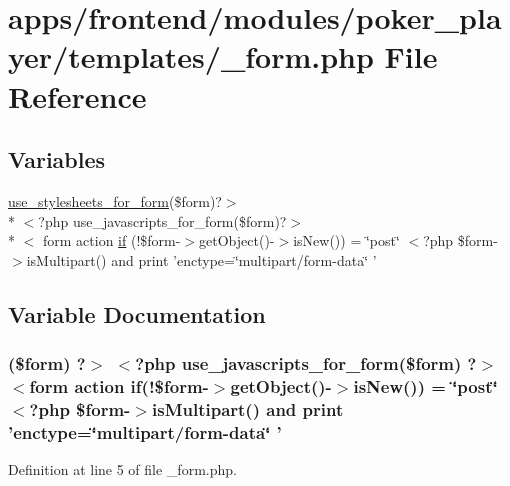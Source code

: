 \hypertarget{frontend_2modules_2poker__player_2templates_2__form_8php}{\section{apps/frontend/modules/poker\-\_\-player/templates/\-\_\-form.php File Reference}
\label{frontend_2modules_2poker__player_2templates_2__form_8php}
}
\subsection*{Variables}
\begin{DoxyCompactItemize}
\item 
\hyperlink{live_2modules_2user_2templates_2__form_8php_a86bc4522fdbe625b07bc4a4d6eec3df7}{use\-\_\-stylesheets\-\_\-for\-\_\-form}(\$form)?$>$\\*
$<$?php use\-\_\-javascripts\-\_\-for\-\_\-form(\$form)?$>$\\*
$<$ form action \hyperlink{frontend_2modules_2poker__player_2templates_2__form_8php_ae30a307b320d8da5d9a945eaf68f7549}{if} (!\$form-\/$>$get\-Object()-\/$>$is\-New()) = \char`\"{}post\char`\"{} $<$?php \$form-\/$>$is\-Multipart() and print 'enctype=\char`\"{}multipart/form-\/data\char`\"{} '
\end{DoxyCompactItemize}


\subsection{Variable Documentation}
\hypertarget{frontend_2modules_2poker__player_2templates_2__form_8php_ae30a307b320d8da5d9a945eaf68f7549}{
\subsubsection[{if}]{ (\$form) ?$>$ $<$?php use\-\_\-javascripts\-\_\-for\-\_\-form(\$form) ?$>$ $<$form action if(!\$form-\/$>$get\-Object()-\/$>$is\-New()) = \char`\"{}post\char`\"{} $<$?php \$form-\/$>$is\-Multipart() and print 'enctype=\char`\"{}multipart/form-\/data\char`\"{} '}}\label{frontend_2modules_2poker__player_2templates_2__form_8php_ae30a307b320d8da5d9a945eaf68f7549}


Definition at line 5 of file \-\_\-form.\-php.

